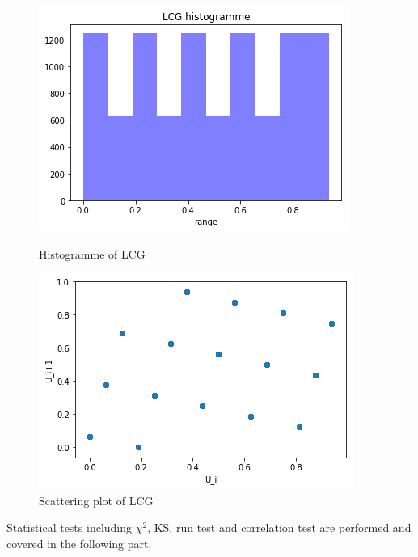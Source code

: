 \begin{figure}[h]
\centering
\begin{minipage}{.5\textwidth}
  \centering
  \includegraphics[width=0.95\linewidth, height = 0.75\linewidth]{figures/lcgHist.png}
  \caption{Histogramme of LCG}
    \label{fig:lcgHist}
\end{minipage}%
\begin{minipage}{.5\textwidth}
  \centering
  \includegraphics[width=0.95\linewidth, height = 0.75\linewidth]{figures/lcgScat.png}
  \caption{Scattering plot of LCG}
  \label{fig:lcgScat}
\end{minipage}
\end{figure}


Statistical tests including $\chi^2$, KS, run test and correlation test are performed and covered in the following part.

